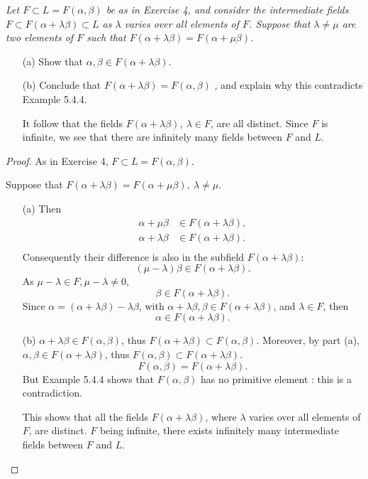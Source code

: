 \documentclass[11pt,a4paper]{article}
\begin{document}
{\it Let $F \subset L = F(\alpha,\beta)$ be as in Exercise 4, and consider the intermediate fields $F \subset F(\alpha + \lambda \beta) \subset L$ as $\lambda$ varies over all elements of $F$. Suppose that $\lambda \ne \mu$ are two elements of $F$ such that $F(\alpha + \lambda \beta) = F(\alpha + \mu \beta)$.
\begin{enumerate}
\item[(a)] Show that $\alpha, \beta \in F(\alpha + \lambda \beta)$.
\item[(b)] Conclude that $F(\alpha + \lambda \beta) = F(\alpha,\beta)$ , and explain why this contradicts Example 5.4.4.

It follow that the fields $F(\alpha + \lambda \beta),\  \lambda \in F$, are all distinct. Since $F$ is infinite, we see that there are infinitely many fields between $F$ and $L$.
\end{enumerate}
}

\begin{proof}
As in Exercise 4,  $F\subset L=F(\alpha,\beta)$.

Suppose that $F(\alpha+\lambda \beta) = F(\alpha+\mu \beta),\  \lambda \neq \mu$.
\begin{enumerate}
\item[(a)]
Then
\begin{align*}
\alpha + \mu \beta &\in F(\alpha+\lambda \beta),\\
\alpha + \lambda \beta &\in F(\alpha+\lambda \beta).\\
\end{align*}
Consequently their difference is also in the subfield $F(\alpha+\lambda \beta)$:
$$(\mu-\lambda) \beta\in F(\alpha+\lambda \beta).$$
As $\mu - \lambda \in F, \mu- \lambda \neq 0$, $$\beta \in F(\alpha+\lambda \beta).$$
Since $\alpha = (\alpha+\lambda \beta) - \lambda \beta$, with $\alpha+\lambda \beta,\beta \in F(\alpha+\lambda \beta)$, and $\lambda \in F$, then
$$\alpha \in F(\alpha+\lambda \beta).$$

\item[(b)]
$\alpha + \lambda \beta \in F(\alpha,\beta)$, thus $F(\alpha + \lambda \beta) \subset F(\alpha,\beta)$.
Moreover, by part (a),  $\alpha,\beta \in F(\alpha+\lambda \beta)$, thus $F(\alpha,\beta) \subset F(\alpha+\lambda \beta)$.
$$F(\alpha,\beta) = F(\alpha+\lambda \beta).$$
But Example 5.4.4 shows that $F(\alpha,\beta)$ has no primitive element : this is a contradiction. 

This shows that all the fields $F(\alpha+\lambda \beta)$, where $\lambda$ varies over all elements of $F$, are distinct. $F$ being infinite, there exists infinitely many intermediate fields between $F$ and $L$.
\end{enumerate}
\end{proof}
\end{document}
